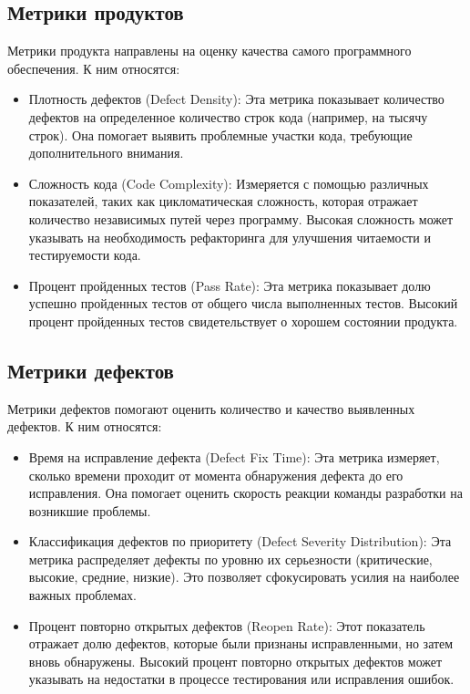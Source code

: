     \subsection{Метрики продуктов}
    Метрики продукта направлены на оценку качества самого программного обеспечения. К ним относятся:
    \begin{itemize}
        \item Плотность дефектов (Defect Density): Эта метрика показывает количество дефектов на определенное количество строк кода (например, на тысячу строк). Она помогает выявить проблемные участки кода, требующие дополнительного внимания.
        \item Сложность кода (Code Complexity): Измеряется с помощью различных показателей, таких как цикломатическая сложность, которая отражает количество независимых путей через программу. Высокая сложность может указывать на необходимость рефакторинга для улучшения читаемости и тестируемости кода.
        \item Процент пройденных тестов (Pass Rate): Эта метрика показывает долю успешно пройденных тестов от общего числа выполненных тестов. Высокий процент пройденных тестов свидетельствует о хорошем состоянии продукта.
    \end{itemize}

    \subsection{Метрики дефектов}
    Метрики дефектов помогают оценить количество и качество выявленных дефектов. К ним относятся:
    \begin{itemize}
        \item Время на исправление дефекта (Defect Fix Time): Эта метрика измеряет, сколько времени проходит от момента обнаружения дефекта до его исправления. Она помогает оценить скорость реакции команды разработки на возникшие проблемы.
        \item Классификация дефектов по приоритету (Defect Severity Distribution): Эта метрика распределяет дефекты по уровню их серьезности (критические, высокие, средние, низкие). Это позволяет сфокусировать усилия на наиболее важных проблемах.
        \item Процент повторно открытых дефектов (Reopen Rate): Этот показатель отражает долю дефектов, которые были признаны исправленными, но затем вновь обнаружены. Высокий процент повторно открытых дефектов может указывать на недостатки в процессе тестирования или исправления ошибок.
    \end{itemize}

